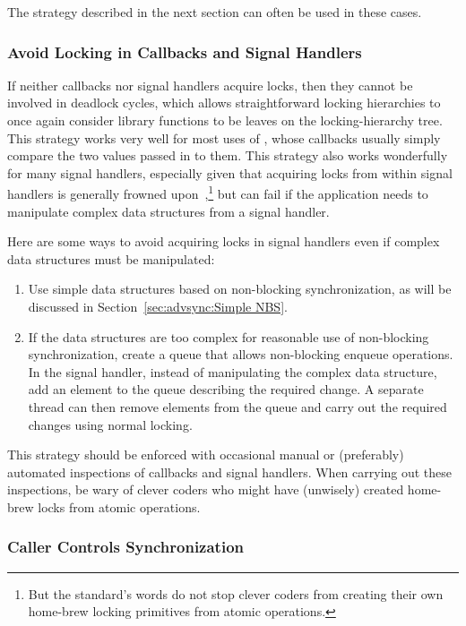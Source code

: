 The strategy described in the next section can often be used in these cases.

\subsubsection{Avoid Locking in Callbacks and Signal Handlers}
\label{sec:locking:Avoid Locking in Callbacks and Signal Handlers}

If neither callbacks nor signal handlers acquire locks, then they
cannot be involved in deadlock cycles, which allows straightforward
locking hierarchies to once again consider library functions to
be leaves on the locking-hierarchy tree.
This strategy works very well for most uses of , whose
callbacks usually simply compare the two values passed in to them.
This strategy also works wonderfully for many signal handlers,
especially given that acquiring locks from within signal handlers
is generally frowned upon~\cite{TheOpenGroup1997SUS},\footnote{
	But the standard's words do not stop clever coders from creating
	their own home-brew locking primitives from atomic operations.}
but can fail if the application needs to manipulate complex data structures
from a signal handler.

Here are some ways to avoid acquiring locks in signal handlers even
if complex data structures must be manipulated:

\begin{enumerate}
\item	Use simple data structures based on non-blocking synchronization,
	as will be discussed in
	Section~\ref{sec:advsync:Simple NBS}.
\item	If the data structures are too complex for reasonable use of
	non-blocking synchronization, create a queue that allows
	non-blocking enqueue operations.
	In the signal handler, instead of manipulating the complex
	data structure, add an element to the queue describing the
	required change.
	A separate thread can then remove elements from the queue and
	carry out the required changes using normal locking.
\end{enumerate}

This strategy should be enforced with occasional manual or (preferably)
automated inspections of callbacks and signal handlers.
When carrying out these inspections, be wary of clever coders who
might have (unwisely) created home-brew locks from atomic operations.

\subsubsection{Caller Controls Synchronization}
\label{sec:locking:Caller Controls Synchronization}

